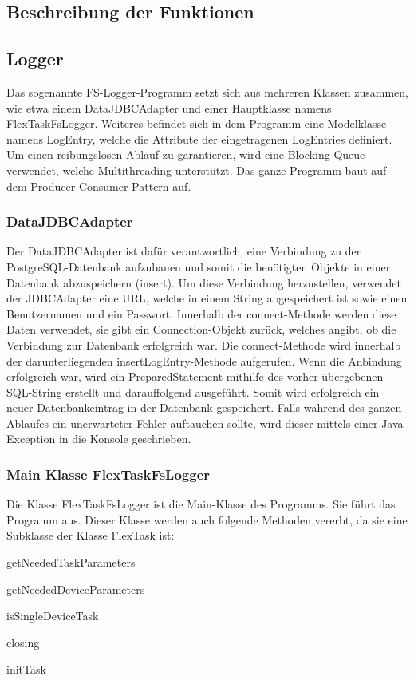 \subsection{Beschreibung der Funktionen}
 
\subsection{Logger}
Das sogenannte FS-Logger-Programm setzt sich aus mehreren Klassen zusammen, wie etwa einem DataJDBCAdapter und einer Hauptklasse namens FlexTaskFsLogger. Weiteres befindet sich in dem Programm eine Modelklasse namens LogEntry, welche die Attribute der eingetragenen LogEntries definiert. Um einen reibungslosen Ablauf zu garantieren, wird eine Blocking-Queue verwendet, welche Multithreading unterstützt. Das ganze Programm baut auf dem Producer-Consumer-Pattern auf.          
 
\subsubsection{DataJDBCAdapter}
Der DataJDBCAdapter ist dafür verantwortlich, eine Verbindung zu der PostgreSQL-Datenbank aufzubauen und somit die benötigten Objekte in einer Datenbank abzuspeichern (insert). Um diese Verbindung herzustellen, verwendet der JDBCAdapter eine URL, welche in einem String abgespeichert ist sowie einen Benutzernamen und ein Passwort. Innerhalb der connect-Methode werden diese Daten verwendet, sie gibt ein Connection-Objekt zurück, welches angibt, ob die Verbindung zur Datenbank erfolgreich war. Die connect-Methode wird innerhalb der darunterliegenden insertLogEntry-Methode aufgerufen. Wenn die Anbindung erfolgreich war, wird ein PreparedStatement mithilfe des vorher übergebenen SQL-String erstellt und darauffolgend ausgeführt. Somit wird erfolgreich ein neuer Datenbankeintrag in der Datenbank gespeichert. Falls während des ganzen Ablaufes ein unerwarteter Fehler auftauchen sollte, wird dieser mittels einer Java-Exception in die Konsole geschrieben.
 
\subsubsection{Main Klasse FlexTaskFsLogger}
Die Klasse FlexTaskFsLogger ist die Main-Klasse des Programms. Sie führt das Programm aus. Dieser Klasse werden auch folgende Methoden vererbt, da sie eine Subklasse der Klasse FlexTask ist:
\begin{compactitem}
    \item getNeededTaskParameters
    \item getNeededDeviceParameters
    \item isSingleDeviceTask
    \item closing
    \item initTask
\end{compactitem}
 
